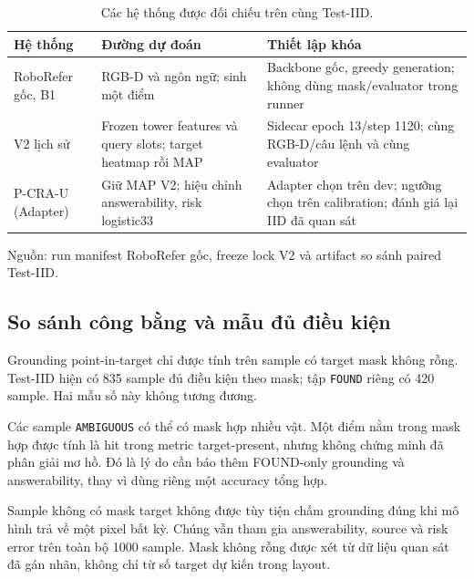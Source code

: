 \begin{table}[htbp]
    \centering
    \setlength{\tabcolsep}{4pt}
    \renewcommand{\arraystretch}{1.15}
    \caption{Các hệ thống được đối chiếu trên cùng Test-IID.}
    \label{tab:setup-primary-baselines}
    \small
    \begin{tabularx}{\textwidth}{@{}>{\raggedright\arraybackslash}p{}>{\raggedright\arraybackslash}p{}>{\raggedright\arraybackslash}X@{}}
        \toprule
        Hệ thống & Đường dự đoán & Thiết lập khóa \\
        \midrule
        RoboRefer gốc, B1 & RGB-D và ngôn ngữ;
        sinh một điểm & Backbone gốc, greedy generation;
        không dùng mask/evaluator trong runner \\
        V2 lịch sử & Frozen tower features và query slots;
        target heatmap rồi MAP & Sidecar epoch 13/step 1120;
        cùng RGB-D/câu lệnh và cùng evaluator \\
        P-CRA-U (Adapter) & Giữ MAP V2; hiệu chỉnh answerability,
        risk logistic33 & Adapter chọn trên dev; ngưỡng chọn trên calibration;
        đánh giá lại IID đã quan sát \\
        \bottomrule
    \end{tabularx}
    \vspace{2pt}
    {\footnotesize\raggedright Nguồn: run manifest RoboRefer gốc, freeze lock V2
    và artifact so sánh paired Test-IID.\par}
\end{table}

\subsection{So sánh công bằng và mẫu đủ điều kiện}

Grounding point-in-target chỉ được tính trên sample có
target mask không rỗng. Test-IID hiện có 835 sample đủ
điều kiện theo mask; tập \texttt{FOUND} riêng có 420 sample.
Hai mẫu số này không tương đương.

Các sample \texttt{AMBIGUOUS} có thể có mask hợp nhiều vật.
Một điểm nằm trong mask hợp được tính là hit trong metric
target-present, nhưng không chứng minh đã phân giải mơ hồ.
Đó là lý do cần báo thêm FOUND-only grounding và
answerability, thay vì dùng riêng một accuracy tổng hợp.

Sample không có mask target không được tùy tiện chấm
grounding đúng khi mô hình trả về một pixel bất kỳ.
Chúng vẫn tham gia answerability, source và risk error
trên toàn bộ 1000 sample.
Mask không rỗng được xét từ dữ liệu quan sát đã gán nhãn,
không chỉ từ số target dự kiến trong layout.

